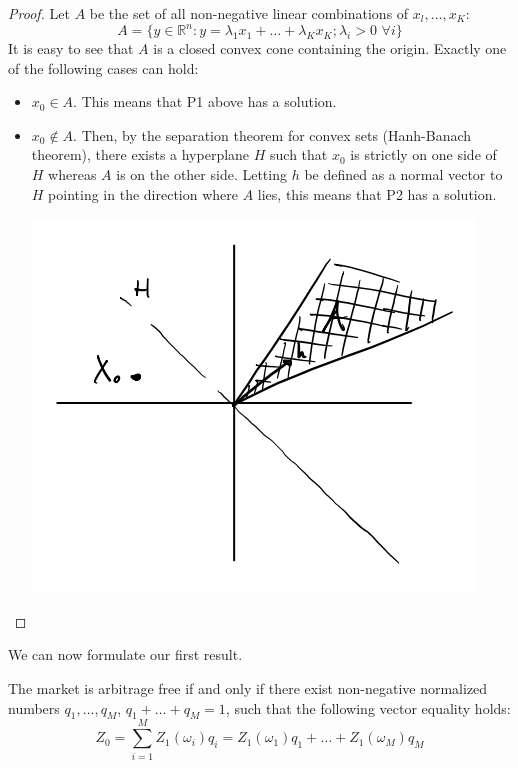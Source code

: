 \begin{proof}
    Let $A$ be the set of all non-negative linear combinations of $x_l,...,x_K$:
    $$A=\{y\in\mathbb{R}^n:y=\lambda_1x_1+\dots+\lambda_Kx_K; \lambda_i>0\,\,\forall i\}$$
    It is easy to see that $A$ is a closed convex cone containing the origin. Exactly one of the following cases can hold:
    \begin{itemize}
    \item $x_0\in A$. This means that P1 above has a solution.
    \item $x_0\notin A$. Then, by the separation theorem for convex sets (Hanh-Banach theorem), there exists a hyperplane $H$ such that $x_0$ is strictly on one side of $H$ whereas $A$ is on the other side. Letting $h$ be defined as a normal vector to $H$ pointing in the direction where $A$ lies, this means that P2 has a solution.
    \begin{center}
        \includegraphics[scale=0.25]{fig/tmp/fig8}
    \end{center}
    \end{itemize}
\end{proof}
We can now formulate our first result.
\begin{theorem}\label{arbfreeth}
    The market is arbitrage free if and only if there exist non-negative normalized numbers $q_1,\dots,q_M$, $q_1+\dots+q_M=1$, such that the following vector equality holds:
    \begin{equation}\label{Z0}
        Z_0 = \sum^M_{i=1} Z_1(\omega_i)q_i = Z_1(\omega_1)q_1 + \dots + Z_1(\omega_M)q_M
    \end{equation}
\end{theorem}
